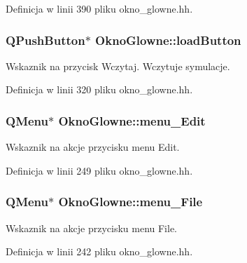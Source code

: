 Definicja w linii 390 pliku okno\+\_\+glowne.\+hh.

\hypertarget{class_okno_glowne_accbadc3bc4d418cfe1bce2be61881917}{}
\subsubsection[{load\+Button}]{\setlength{\rightskip}{0pt plus 5cm}Q\+Push\+Button$\ast$ Okno\+Glowne\+::load\+Button\hspace{0.3cm}{\ttfamily [private]}}\label{class_okno_glowne_accbadc3bc4d418cfe1bce2be61881917}
Wskaznik na przycisk Wczytaj. Wczytuje symulacje. 

Definicja w linii 320 pliku okno\+\_\+glowne.\+hh.

\hypertarget{class_okno_glowne_a93afadd0ec22ce6a7e29acc5dd2423a2}{}
\subsubsection[{menu\+\_\+\+Edit}]{\setlength{\rightskip}{0pt plus 5cm}Q\+Menu$\ast$ Okno\+Glowne\+::menu\+\_\+\+Edit\hspace{0.3cm}{\ttfamily [private]}}\label{class_okno_glowne_a93afadd0ec22ce6a7e29acc5dd2423a2}
Wskaznik na akcje przycisku menu Edit. 

Definicja w linii 249 pliku okno\+\_\+glowne.\+hh.

\hypertarget{class_okno_glowne_a1ba162db2d0b06b0f8963e61b3806875}{}
\subsubsection[{menu\+\_\+\+File}]{\setlength{\rightskip}{0pt plus 5cm}Q\+Menu$\ast$ Okno\+Glowne\+::menu\+\_\+\+File\hspace{0.3cm}{\ttfamily [private]}}\label{class_okno_glowne_a1ba162db2d0b06b0f8963e61b3806875}
Wskaznik na akcje przycisku menu File. 

Definicja w linii 242 pliku okno\+\_\+glowne.\+hh.

\hypertarget{class_okno_glowne_ab17be6714913af0cdf4e7de7cb6210d1}{}
